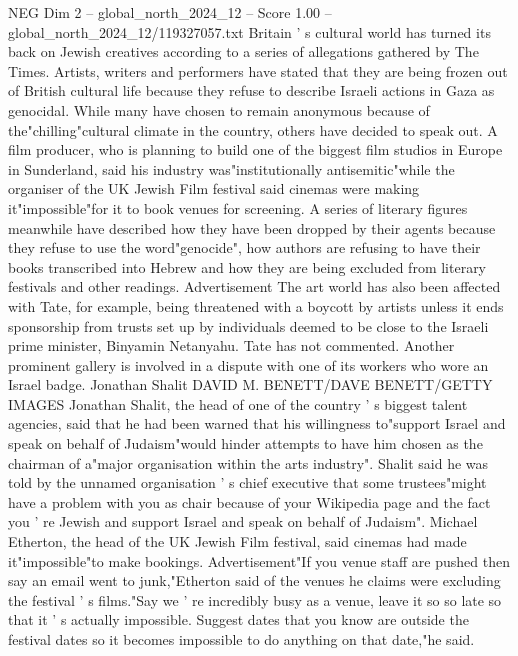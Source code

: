 \begin{textsample}{NEG Dim 2 – global\_north\_2024\_12 – Score 1.00 – global\_north\_2024\_12/119327057.txt}  \label{ex:f2_neg_265}
Britain ' s cultural world has turned its back on Jewish creatives according to a series of allegations gathered by The Times.
Artists, writers and performers have stated that they are being frozen out of British cultural life because they refuse to describe Israeli actions in Gaza as genocidal.
While many have chosen to remain anonymous because of the"chilling"cultural climate in the country, others have decided to speak out.
A film producer, who is planning to build one of the biggest film studios in Europe in Sunderland, said his industry was"institutionally antisemitic"while the organiser of the UK Jewish Film festival said cinemas were making it"impossible"for it to book venues for screening.
A series of literary figures meanwhile have described how they have been dropped by their agents because they refuse to use the word"genocide", how authors are refusing to have their books transcribed into Hebrew and how they are being excluded from literary festivals and other readings.
Advertisement The art world has also been affected with Tate, for example, being threatened with a boycott by artists unless it ends sponsorship from trusts set up by individuals deemed to be close to the Israeli prime minister, Binyamin Netanyahu.
Tate has not commented.
Another prominent gallery is involved in a dispute with one of its workers who wore an Israel badge.
Jonathan Shalit DAVID M.
BENETT/DAVE BENETT/GETTY IMAGES Jonathan Shalit, the head of one of the country ' s biggest talent agencies, said that he had been warned that his willingness to"support Israel and speak on behalf of Judaism"would hinder attempts to have him chosen as the chairman of a"major organisation within the arts industry".
Shalit said he was told by the unnamed organisation ' s chief executive that some trustees"might have a problem with you as chair because of your Wikipedia page and the fact you ' re Jewish and support Israel and speak on behalf of Judaism".
Michael Etherton, the head of the UK Jewish Film festival, said cinemas had made it"impossible"to make bookings.
Advertisement"If you venue staff are pushed then say an email went to junk,"Etherton said of the venues he claims were excluding the festival ' s films."Say we ' re incredibly busy as a venue, leave it so so late so that it ' s actually impossible.
Suggest dates that you know are outside the festival dates so it becomes impossible to do anything on that date,"he said.

\end{textsample}
